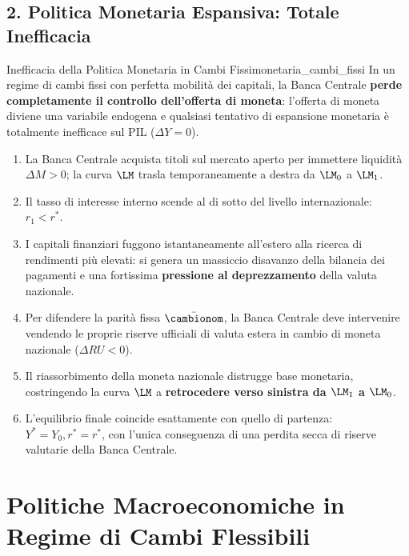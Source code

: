 \subsection{2. Politica Monetaria Espansiva: Totale Inefficacia}

\begin{teorema}{Inefficacia della Politica Monetaria in Cambi Fissi}{monetaria_cambi_fissi}
In un regime di cambi fissi con perfetta mobilità dei capitali, la Banca Centrale \textbf{perde completamente il controllo dell'offerta di moneta}: l'offerta di moneta diviene una variabile endogena e qualsiasi tentativo di espansione monetaria è totalmente inefficace sul PIL ($\Delta Y = 0$).
\end{teorema}

\begin{dimostrazione}
\begin{enumerate}
    \item La Banca Centrale acquista titoli sul mercato aperto per immettere liquidità $\Delta M > 0$; la curva $\LM$ trasla temporaneamente a destra da $\LM_0$ a $\LM_1$.
    \item Il tasso di interesse interno scende al di sotto del livello internazionale: $r_1 < r^*$.
    \item I capitali finanziari fuggono istantaneamente all'estero alla ricerca di rendimenti più elevati: si genera un massiccio disavanzo della bilancia dei pagamenti e una fortissima \textbf{pressione al deprezzamento} della valuta nazionale.
    \item Per difendere la parità fissa $\bar{\cambionom}$, la Banca Centrale deve intervenire vendendo le proprie riserve ufficiali di valuta estera in cambio di moneta nazionale ($\Delta RU < 0$).
    \item Il riassorbimento della moneta nazionale distrugge base monetaria, costringendo la curva $\LM$ a \textbf{retrocedere verso sinistra da $\LM_1$ a $\LM_0$}.
    \item L'equilibrio finale coincide esattamente con quello di partenza: $Y^* = Y_0, r^* = r^*$, con l'unica conseguenza di una perdita secca di riserve valutarie della Banca Centrale.
\end{enumerate}
\end{dimostrazione}

\section{Politiche Macroeconomiche in Regime di Cambi Flessibili}

